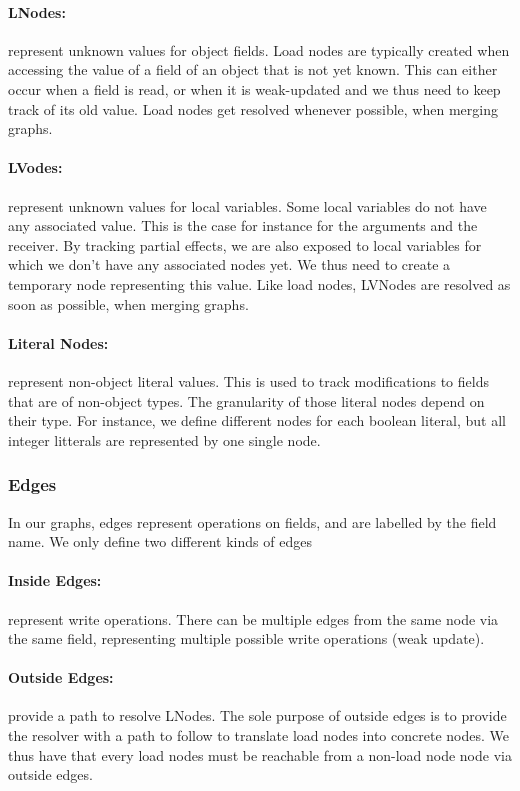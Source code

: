 \documentclass[a4paper]{article}
\begin{document}
\paragraph{LNodes:} represent unknown values for object fields. Load nodes are
typically created when accessing the value of a field of an object that is not
yet known. This can either occur when a field is read, or when it is
weak-updated and we thus need to keep track of its old value. Load nodes get
resolved whenever possible, when merging graphs.

\paragraph{LVodes:} represent unknown values for local variables. Some local
variables do not have any associated value. This is the case for instance for
the arguments and the receiver. By tracking partial effects, we are also
exposed to local variables for which we don't have any associated nodes yet. We
thus need to create a temporary node representing this value. Like load nodes,
LVNodes are resolved as soon as possible, when merging graphs.

\paragraph{Literal Nodes:} represent non-object literal values. This is used to
track modifications to fields that are of non-object types. The granularity of
those literal nodes depend on their type. For instance, we define different
nodes for each boolean literal, but all integer litterals are represented by one
single node.

\subsubsection{Edges}
In our graphs, edges represent operations on fields, and are labelled by the
field name. We only define two different kinds of edges

\paragraph{Inside Edges:} represent write operations. There can be multiple
edges from the same node via the same field, representing multiple possible
write operations (weak update).

\paragraph{Outside Edges:} provide a path to resolve LNodes. The sole purpose
of outside edges is to provide the resolver with a path to follow to translate
load nodes into concrete nodes. We thus have that every load nodes must be
reachable from a non-load node node via outside edges.
\end{document}
